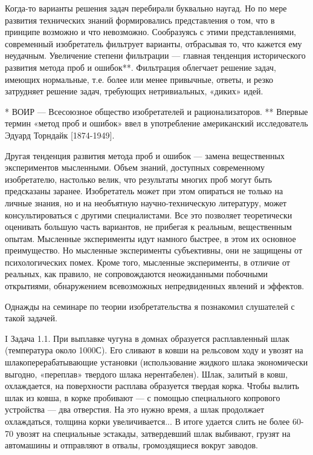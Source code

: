 Когда-то  варианты  решения  задач  перебирали  буквально  наугад.  Но
по  мере развития  технических  знаний  формировались представления  о
том,  что  в  принципе  возможно   и  что  невозможно.  Сообразуясь  с
этими  представлениями, современный  изобретатель фильтрует  варианты,
отбрасывая  то,   что  кажется   ему  неудачным.   Увеличение  степени
фильтрации —  главная тенденция  исторического развития метода  проб и
ошибок**. Фильтрация облегчает решение задач, имеющих нормальные, т.е.
более или менее  привычные, ответы, и резко  затрудняет решение задач,
требующих нетривиальных, «диких» идей.

*  ВОИР  —  Всесоюзное   общество  изобретателей  и
рационализаторов.   **   Впервые   термин  «метод   проб   и   ошибок»
ввел  в   употребление  американский  исследователь   Эдуард  Торндайк
[1874-1949].


Другая тенденция развития  метода проб и ошибок  — замена вещественных
экспериментов   мысленными.  Объем   знаний,  доступных   современному
изобретателю,  настолько  велик,  что  результаты  многих  проб  могут
быть  предсказаны заранее.  Изобретатель может  при этом  опираться не
только  на  личные  знания,  но  и  на  необъятную  научно-техническую
литературу, может  консультироваться с другими специалистами.  Все это
позволяет теоретически оценивать большую  часть вариантов, не прибегая
к реальным,  вещественным опытам. Мысленные эксперименты  идут намного
быстрее, в  этом их  основное преимущество. Но  мысленные эксперименты
субъективны,  они   не  защищены   от  психологических   помех.  Кроме
того,  мысленные эксперименты,  в  отличие от  реальных, как  правило,
не  сопровождаются  неожиданными  побочными  открытиями,  обнаружением
всевозможных непредвиденных явлений и эффектов.


Однажды на семинаре по теории изобретательства я познакомил слушателей
с такой задачей.

I Задача  1.1. При выплавке  чугуна в домнах  образуется расплавленный
шлак (температура около 1000С). Его сливают в ковши на рельсовом ходу
и  увозят на  шлакоперерабатывающие  установки (использование  жидкого
шлака экономически  выгодно, «переплав» твердого  шлака нерентабелен).
Шлак, залитый в ковш,  охлаждается, на поверхности расплава образуется
твердая  корка.  Чтобы вылить  шлак  из  ковша,  в корке  пробивают  —
с  помощью  специального  копрового  устройства —  два  отверстия.  На
это  нужно  время,  а   шлак  продолжает  охлаждаться,  толщина  корки
увеличивается... В  итоге удается слить  не более 60-70%
увозят на специальные эстакады,  затвердевший шлак выбивают, грузят на
автомашины и отправляют в отвалы, громоздящиеся вокруг заводов.

